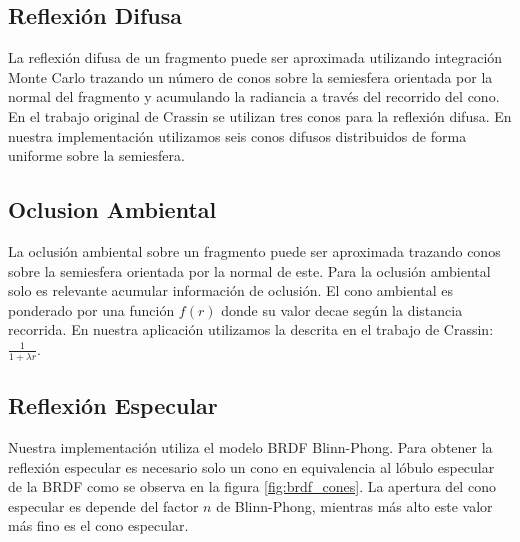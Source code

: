 \subsection{Reflexión Difusa}
La reflexión difusa de un fragmento puede ser aproximada utilizando integración Monte Carlo trazando un número de conos sobre la semiesfera orientada por la normal del fragmento y acumulando la radiancia a través del recorrido del cono. En el trabajo original de Crassin se utilizan tres conos para la reflexión difusa. En nuestra implementación utilizamos seis conos difusos distribuidos de forma uniforme sobre la semiesfera.
\subsection{Oclusion Ambiental}
La oclusión ambiental sobre un fragmento puede ser aproximada trazando conos sobre la semiesfera orientada por la normal de este. Para la oclusión ambiental solo es relevante acumular información de oclusión. El cono ambiental es ponderado por una función $f(r)$ donde su valor decae según la distancia recorrida. En nuestra aplicación utilizamos la descrita en el trabajo de Crassin: $\frac{1}{1+\lambda r}$.
\subsection{Reflexión Especular}
Nuestra implementación utiliza el modelo \ac{BRDF} Blinn-Phong. Para obtener la reflexión especular es necesario solo un cono en equivalencia al lóbulo especular de la \ac{BRDF} como se observa en la figura \ref{fig:brdf_cones}. La apertura del cono especular es depende del factor $n$ de Blinn-Phong, mientras más alto este valor más fino es el cono especular.

